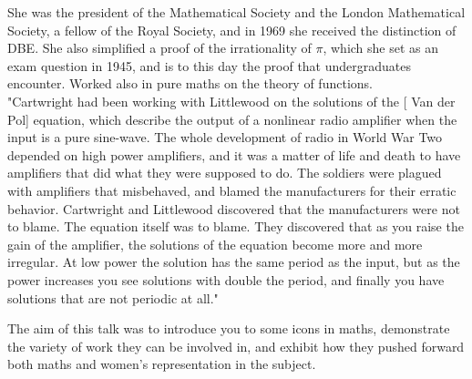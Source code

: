 \documentclass{article}
\begin{document}
\begin{itemize}
    She was the president of the Mathematical Society and the London Mathematical Society, a fellow of the Royal Society, and in 1969 she received the distinction of DBE. She also simplified a proof of the irrationality of $\pi$, which she set as an exam question in 1945, and is to this day the proof that undergraduates encounter. Worked also in pure maths on the theory of functions.  \\
    \newline
    "Cartwright had been working with Littlewood on the solutions of the [ Van der Pol] equation, which describe the output of a nonlinear radio amplifier when the input is a pure sine-wave. The whole development of radio in World War Two depended on high power amplifiers, and it was a matter of life and death to have amplifiers that did what they were supposed to do. The soldiers were plagued with amplifiers that misbehaved, and blamed the manufacturers for their erratic behavior. Cartwright and Littlewood discovered that the manufacturers were not to blame. The equation itself was to blame. They discovered that as you raise the gain of the amplifier, the solutions of the equation become more and more irregular. At low power the solution has the same period as the input, but as the power increases you see solutions with double the period, and finally you have solutions that are not periodic at all."
    \newline
    
\end{itemize}

The aim of this talk was to introduce you to some icons in maths, demonstrate the variety of work they can be involved in, and exhibit how they pushed forward both maths and women's representation in the subject. 
\end{document}

